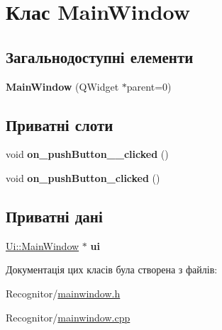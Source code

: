 \hypertarget{classMainWindow}{\section{Клас Main\-Window}
\label{classMainWindow}
}
\subsection*{Загальнодоступні елементи}
\begin{DoxyCompactItemize}
\item 
\hypertarget{classMainWindow_a8b244be8b7b7db1b08de2a2acb9409db}{{\bfseries Main\-Window} (Q\-Widget $\ast$parent=0)}\label{classMainWindow_a8b244be8b7b7db1b08de2a2acb9409db}

\end{DoxyCompactItemize}
\subsection*{Приватні слоти}
\begin{DoxyCompactItemize}
\item 
\hypertarget{classMainWindow_ae0e46dc3da4ee07bf66e73e20300220c}{void {\bfseries on\-\_\-push\-Button\-\_\-\_\-clicked} ()}\label{classMainWindow_ae0e46dc3da4ee07bf66e73e20300220c}

\item 
\hypertarget{classMainWindow_a4de79c63c7fa0b8d7c468ac71f20be81}{void {\bfseries on\-\_\-push\-Button\-\_\-clicked} ()}\label{classMainWindow_a4de79c63c7fa0b8d7c468ac71f20be81}

\end{DoxyCompactItemize}
\subsection*{Приватні дані}
\begin{DoxyCompactItemize}
\item 
\hypertarget{classMainWindow_a35466a70ed47252a0191168126a352a5}{\hyperlink{classUi_1_1MainWindow}{Ui\-::\-Main\-Window} $\ast$ {\bfseries ui}}\label{classMainWindow_a35466a70ed47252a0191168126a352a5}

\end{DoxyCompactItemize}


Документація цих класів була створена з файлів\-:\begin{DoxyCompactItemize}
\item 
Recognitor/\hyperlink{mainwindow_8h}{mainwindow.\-h}\item 
Recognitor/\hyperlink{mainwindow_8cpp}{mainwindow.\-cpp}\end{DoxyCompactItemize}
